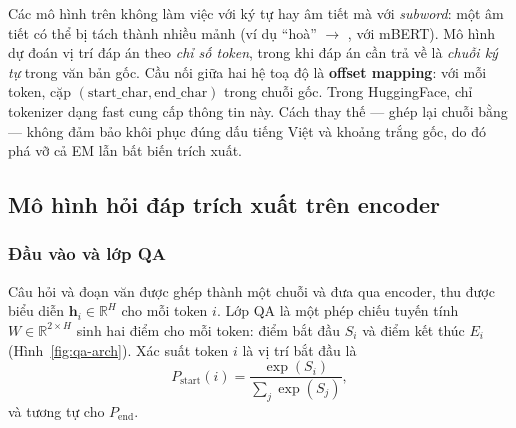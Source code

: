 Các mô hình trên không làm việc với ký tự hay âm tiết mà với \emph{subword}: một âm
tiết có thể bị tách thành nhiều mảnh (ví dụ ``hoà'' $\to$ ,  với
mBERT). Mô hình dự đoán vị trí đáp án theo \emph{chỉ số token}, trong khi đáp án cần trả
về là \emph{chuỗi ký tự} trong văn bản gốc. Cầu nối giữa hai hệ toạ độ là \textbf{offset
mapping}: với mỗi token, cặp $(\text{start\_char}, \text{end\_char})$ trong chuỗi gốc.
Trong HuggingFace, chỉ tokenizer dạng fast cung cấp thông tin này. Cách thay thế --- ghép
lại chuỗi bằng  --- không đảm bảo khôi phục đúng dấu tiếng Việt
và khoảng trắng gốc, do đó phá vỡ cả EM lẫn bất biến trích xuất.

\subsection{Mô hình hỏi đáp trích xuất trên encoder}
\label{sec:qahead}

\subsubsection{Đầu vào và lớp QA}

Câu hỏi và đoạn văn được ghép thành một chuỗi
 và đưa qua encoder, thu được biểu diễn
$\mathbf{h}_i \in \mathbb{R}^{H}$ cho mỗi token $i$. Lớp QA là một phép chiếu tuyến tính
$W \in \mathbb{R}^{2 \times H}$ sinh hai điểm cho mỗi token: điểm bắt đầu $S_i$ và điểm
kết thúc $E_i$ (Hình~\ref{fig:qa-arch}). Xác suất token $i$ là vị trí bắt đầu là
\begin{equation}
  P_{\text{start}}(i) = \frac{\exp(S_i)}{\sum_j \exp(S_j)},
\end{equation}
và tương tự cho $P_{\text{end}}$.

